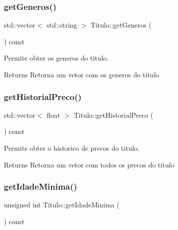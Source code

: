 \mbox{\label{class_titulo_a09992b973f8cfe755f21ff725b2970f0}} 
\subsubsection{\texorpdfstring{get\+Generos()}{getGeneros()}}
{\footnotesize\ttfamily std\+::vector$<$ std\+::string $>$ Titulo\+::get\+Generos (\begin{DoxyParamCaption}{ }\end{DoxyParamCaption}) const}



Permite obter os generos do titulo. 

\begin{DoxyReturn}{Returns}
Retorna um vetor com os generos do titulo 
\end{DoxyReturn}
\mbox{\label{class_titulo_ab392d79a55b0ce556e03ad5a2fecad05}} 
\subsubsection{\texorpdfstring{get\+Historial\+Preco()}{getHistorialPreco()}}
{\footnotesize\ttfamily std\+::vector$<$ float $>$ Titulo\+::get\+Historial\+Preco (\begin{DoxyParamCaption}{ }\end{DoxyParamCaption}) const}



Permite obter o historico de precos do titulo. 

\begin{DoxyReturn}{Returns}
Retorna um vetor com todos os precos do titulo 
\end{DoxyReturn}
\mbox{\label{class_titulo_a8048db7604abd58892122c810a6794be}} 
\subsubsection{\texorpdfstring{get\+Idade\+Minima()}{getIdadeMinima()}}
{\footnotesize\ttfamily unsigned int Titulo\+::get\+Idade\+Minima (\begin{DoxyParamCaption}{ }\end{DoxyParamCaption}) const}




